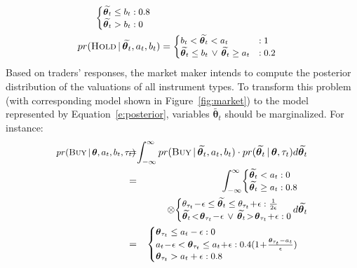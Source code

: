 {\begin{align*}
{\footnotesize
\begin{cases}
\widetilde{\boldsymbol\theta_{t}} \leq b_{t} 		: 0.8\\
\widetilde{\boldsymbol\theta_{t}} > b_{t} 		: 0
\end{cases}
}
\\
pr (\textsc{Hold} \, | \, \widetilde{\boldsymbol\theta_{t}}, a_{t}, b_{t}) &=
{\footnotesize
\begin{cases}
b_{t} < \widetilde{\boldsymbol\theta_{t}} < 
a_{t} 								 & : 1\\
\widetilde{\boldsymbol\theta_{t}} \leq b_{t} \, \vee\,  
\widetilde{\boldsymbol\theta_{t}} 
\geq a_{t}	 	 & : 0.2
\end{cases}
}
\end{align*}
Based on traders' responses, the market maker intends to compute the posterior distribution of the valuations of all instrument types.
To transform this problem (with corresponding model shown in 
Figure~\ref{fig:market})
to the model represented by Equation~\ref{e:posterior}, variables 
$\widetilde{\boldsymbol\theta_{t}}$ should be marginalized.
For instance:
{\footnotesize
\begin{eqnarray}
{\footnotesize
pr(\textsc{Buy} \, | \, \boldsymbol\theta, a_{t}, b_{t}, \tau_t) \!\!\!\!\!\! 
}
&=&\!\!\!\!\!\! 
\int_{-\infty}^{\infty} pr(\textsc{Buy} \, | \, 
\widetilde{\boldsymbol\theta_t}, a_{t}, b_{t})
\cdot pr (\widetilde{\boldsymbol\theta_t} \, | \, \boldsymbol\theta, \tau_t ) d 
\widetilde{\boldsymbol\theta_t} 
\nonumber 
\\
&=&\!\!\!\!\!\! \int_{-\infty}^{\infty}
{\footnotesize
\!
\begin{cases}
\widetilde{\boldsymbol\theta_t}  		<     a_{t}  : 0\\
\widetilde{\boldsymbol\theta_t}  		\geq a_{t}  : 0.8
\end{cases} 
}
\nonumber 
\\
&& \qquad 
\otimes
{\footnotesize
\begin{cases}
\theta_{\tau_t} \!-\! \epsilon \leq \widetilde{\boldsymbol\theta_t} \leq 
\theta_{\tau_t} \!+\! \epsilon 					: \frac{1}{2 \epsilon} \\
\widetilde{\boldsymbol\theta_t} \!<\! \boldsymbol\theta_{\tau_t} \!-\! \epsilon 
\, \vee \, \widetilde{\boldsymbol\theta_t} \!>\! \boldsymbol\theta_{\tau_t} 
\!+\! \epsilon 	: 0  
\end{cases}
}
\!\!\!\!\!
d \widetilde{\boldsymbol\theta_t}
\nonumber \\
&=&\!\!\!\!\!\!
{\footnotesize
\begin{cases}
\boldsymbol\theta_{\tau_t} \leq a_{t} - \epsilon: 0\\
a_{t} \!-\! \epsilon < \boldsymbol\theta_{\tau_t} \leq a_{t} \!+\! \epsilon: 
0.4(1 \!+\! \frac{\boldsymbol\theta_{\tau_t} - a_t}{\epsilon})\\
\boldsymbol\theta_{\tau_t} > a_{t} + \epsilon : 0.8
\end{cases}
}
\end{eqnarray}
}}%

